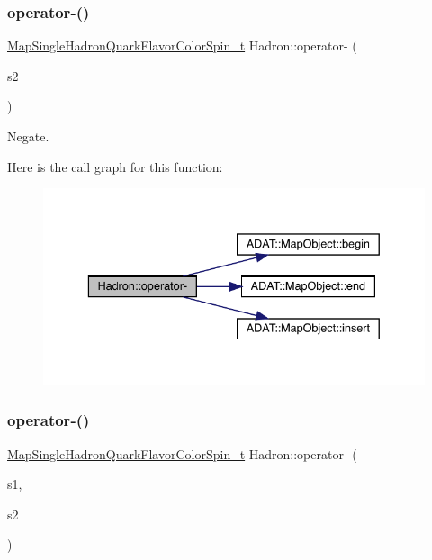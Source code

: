 \subsubsection{\texorpdfstring{operator-\/()}{operator-()}\hspace{0.1cm}{\footnotesize\ttfamily [5/6]}}
{\footnotesize\ttfamily \mbox{\hyperlink{namespaceHadron_a03b319764f85c20434f20a269ce5f388}{Map\+Single\+Hadron\+Quark\+Flavor\+Color\+Spin\+\_\+t}} Hadron\+::operator-\/ (\begin{DoxyParamCaption}\item[{const \mbox{\hyperlink{namespaceHadron_a03b319764f85c20434f20a269ce5f388}{Map\+Single\+Hadron\+Quark\+Flavor\+Color\+Spin\+\_\+t}} \&}]{s2 }\end{DoxyParamCaption})}



Negate. 

Here is the call graph for this function\+:
\nopagebreak
\begin{figure}[H]
\begin{center}
\leavevmode
\includegraphics[width=336pt]{d1/daf/namespaceHadron_a2cee38a50a5e1ed5fbff1d9e4df08bdd_cgraph}
\end{center}
\end{figure}
\mbox{\label{namespaceHadron_ad7c424c3185becdcc1423060951ff98e}} 
\subsubsection{\texorpdfstring{operator-\/()}{operator-()}\hspace{0.1cm}{\footnotesize\ttfamily [6/6]}}
{\footnotesize\ttfamily \mbox{\hyperlink{namespaceHadron_a03b319764f85c20434f20a269ce5f388}{Map\+Single\+Hadron\+Quark\+Flavor\+Color\+Spin\+\_\+t}} Hadron\+::operator-\/ (\begin{DoxyParamCaption}\item[{const \mbox{\hyperlink{namespaceHadron_a03b319764f85c20434f20a269ce5f388}{Map\+Single\+Hadron\+Quark\+Flavor\+Color\+Spin\+\_\+t}} \&}]{s1,  }\item[{const \mbox{\hyperlink{namespaceHadron_a03b319764f85c20434f20a269ce5f388}{Map\+Single\+Hadron\+Quark\+Flavor\+Color\+Spin\+\_\+t}} \&}]{s2 }\end{DoxyParamCaption})}



